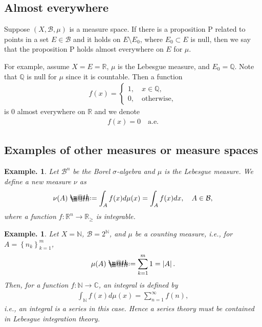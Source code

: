 \documentclass[openany, a4paper, oneside]{jsbook}
\makeatletter
\newcommand*{\defeq}{\mathrel{\rlap{%
\raisebox{0.3ex}{$\m@th\cdot$}}%
\raisebox{-0.3ex}{$\m@th\cdot$}}%
=}
\theoremstyle{break}
\theoremstyle{breakdefn}
\newtheorem{ex}[thm]{Example.}
\newcommand{\abs}[1]{\left|#1\right|}
\newcommand{\cbk}[1]{\left\{#1\right\}}
\newcommand{\bbC}{\mathbb{C}}
\newcommand{\bbN}{\mathbb{N}}
\newcommand{\bbQ}{\mathbb{Q}}
\newcommand{\bbR}{\mathbb{R}}
\newcommand{\bbRn}{\mathbb{R}^n}
\newcommand{\calB}{\mathcal{B}}
\makeatother
\begin{document}
\subsection{Almost everywhere}


Suppose $(X, \calB, \mu)$ is a measure space.
If there is a proposition P related to points in a set $E \in \calB$
and it holds on $E \setminus E_0$, where $E_0 \subset E$ is null,
then we say that the proposition P holds almost everywhere on $E$ for $\mu$.

For example, assume $X = E = \bbR$, $\mu$ is the Lebesgue measure, and $E_0 = \bbQ$.
Note that $\bbQ$ is null for $\mu$ since it is countable.
Then a function
\begin{align}
 f (x)
 =
 \begin{cases}
 1, \quad x \in \bbQ, \\
 0, \quad \text{otherwise},
 \end{cases}
\end{align}
is $0$ almost everywhere on $\bbR$ and we denote
\begin{align}
 f (x) = 0 \quad \text{a.e.}
\end{align}
\subsection{Examples of other measures or measure spaces}


\begin{ex}
 Let $\calB^n$ be the Borel $\sigma$-algebra and $\mu$ is the Lebesgue measure.
 We define a new measure $\nu$ as
 \begin{align}
  \nu (A)
  \defeq
  \int_A f (x) d \mu (x)
  =
  \int_A f (x) dx, \quad A \in \calB,
 \end{align}
 where a function $f \colon \bbRn \to \bbR_{\geq}$ is integrable.
\end{ex}
\begin{ex}
 Let $X = \bbN$, $\calB = 2^{\bbN}$, and $\mu$ be a counting measure, i.e., for $A = \cbk{n_k}_{k=1}^m$,
 \begin{align}
  \mu (A)
  \defeq
  \sum_{k=1}^m 1
  =
  \abs{A}.
 \end{align}
 Then, for a function $f \colon \bbN \to \bbC$, an integral is defined by
 \begin{align}
  \int_{\bbN} f (x) d \mu (x)
  =
  \sum_{n=1}^{\infty} f (n),
 \end{align}
 i.e., an integral is a series in this case.
 Hence a series theory must be contained in Lebesgue integration theory.
\end{ex}
\end{document}
